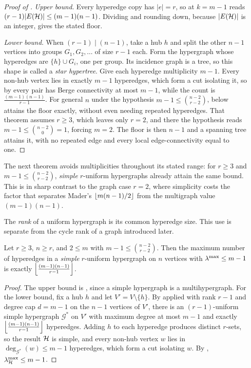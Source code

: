 \begin{proof}[Proof of ]
\emph{Upper bound.} Every hyperedge copy has $|e| = r$, so
 at $k = m-1$ reads
$(r-1)|E(\mathcal{H})| \le (m-1)(n-1)$. Dividing and rounding down, because
$|E(\mathcal{H})|$ is an integer, gives the stated floor.

\emph{Lower bound.} When $(r-1) \mid (n-1)$, take a hub $h$ and split the other $n-1$ vertices into groups $G_1, G_2, \dots$ of size $r-1$ each. Form the hypergraph whose hyperedges are $\{h\} \cup G_i$, one per group. Its incidence graph is a tree, so this shape is called a \emph{star hypertree}. Give each hyperedge multiplicity $m-1$. Every non-hub vertex lies in exactly $m-1$ hyperedges, which form a cut isolating it, so by  every pair has Berge connectivity at most $m-1$, while the count is $\frac{(m-1)(n-1)}{r-1}$. For general $n$ under the hypothesis $m-1 \le \binom{n-2}{r-2}$,  below attains the floor exactly, without even needing repeated hyperedges. That theorem assumes $r \ge 3$, which leaves only $r = 2$, and there the hypothesis reads $m-1 \le \binom{n-2}{0} = 1$, forcing $m = 2$. The floor is then $n-1$ and a spanning tree attains it, with no repeated edge and every local edge-connectivity equal to one.
\end{proof}

The next theorem avoids multiplicities throughout its stated range: for $r \ge 3$ and $m-1\le\binom{n-2}{r-2}$, \emph{simple} $r$-uniform hypergraphs already attain the same bound. This is in sharp contrast to the graph case $r = 2$, where simplicity costs the factor that separates Mader's $\left\lfloor m(n-1)/2 \right\rfloor$ from the multigraph value $(m-1)(n-1)$.

The \emph{rank} of a uniform hypergraph is its common hyperedge size. This use
is separate from the cycle rank of a graph introduced later.

\begin{theorem}\label{thm:simple-hyper-edge}
Let $r \ge 3$, $n \ge r$, and $2 \le m$ with $m-1 \le \binom{n-2}{r-2}$. Then the maximum number of hyperedges in a \emph{simple} $r$-uniform hypergraph on $n$ vertices with $\lambda^{\max}\le m-1$ is exactly $\left\lfloor \frac{(m-1)(n-1)}{r-1} \right\rfloor$.
\end{theorem}

\begin{proof}
The upper bound is , since a simple hypergraph is a multihypergraph. For the lower bound, fix a hub $h$ and let $V' = V \setminus \{h\}$. By  applied with rank $r-1$ and degree cap $d = m-1$ on the $n-1$ vertices of $V'$, there is an $(r-1)$-uniform simple hypergraph $\mathcal{G}^*$ on $V'$ with maximum degree at most $m-1$ and exactly $\left\lfloor \frac{(m-1)(n-1)}{r-1} \right\rfloor$ hyperedges. Adding $h$ to each hyperedge produces distinct $r$-sets, so the result $\mathcal{H}$ is simple, and every non-hub vertex $w$ lies in $\deg_{\mathcal{G}^*}(w) \le m-1$ hyperedges, which form a cut isolating $w$. By , $\lambda^{\max}_{\mathcal{H}} \le m-1$.
\end{proof}

